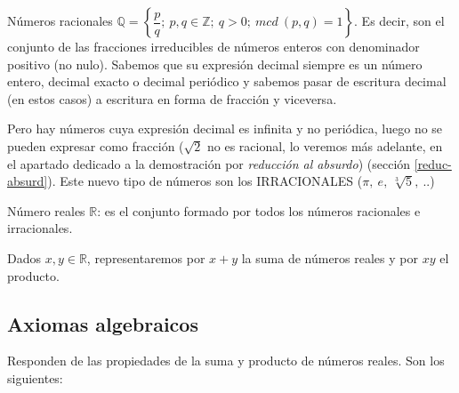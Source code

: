 		Números racionales $ \mathbb {Q} =\left\{\dfrac p q; \  p,q\in \mathbb {Z}; \ q>0; \ mcd\ (p,q)=1 \right\}$. Es decir, son el conjunto de las fracciones irreducibles de números enteros con denominador positivo (no nulo). Sabemos que su expresión decimal siempre es un número entero, decimal exacto o decimal periódico y sabemos pasar de escritura decimal (en estos casos) a escritura en forma de fracción y viceversa. 
		
		Pero hay números cuya expresión decimal es infinita y no periódica, luego no se pueden expresar como fracción ($\sqrt 2$ no es racional, lo veremos más adelante, en el apartado dedicado a la demostración por \emph{reducción al absurdo}) (sección \ref{reduc-absurd}). Este nuevo tipo de números son los IRRACIONALES ($\pi, \ e, \ \sqrt[3]{5}, \ ..$)
	
		Número reales $\mathbb R$: es el conjunto formado por todos los números racionales e irracionales.
	
		Dados $x,y \in \mathbb R$, representaremos por $x+y$ la suma de números reales y por $xy$ el producto.
	
		
	
	\subsection{Axiomas algebraicos}
		
		\begin{axio} Responden de las propiedades de la suma y producto de números reales. Son los siguientes:	
		\end{axio}
 
